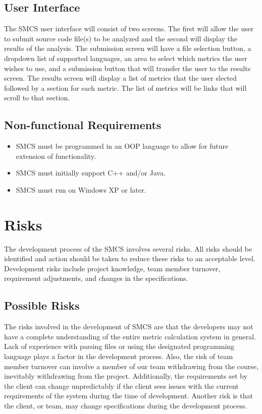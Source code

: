 \documentclass{scrreprt}
\begin{document}
	\section{User Interface}
	The SMCS user interface will consist of two screens. The first will allow the user to submit source code file(s) to be analyzed and the second will display the results of the analysis. The submission screen will have a file selection button, a dropdown list of supported languages, an area to select which metrics the user wishes to use, and a submission button that will transfer the user to the results screen. The results screen will display a list of metrics that the user slected followed by a section for each metric. The list of metrics will be links that will scroll to that section.
	
	\section{Non-functional Requirements}
	\begin{itemize}
		\item SMCS must be programmed in an OOP language to allow for future extension of functionality.
		\item  SMCS must initially support C++ and/or Java.
		\item SMCS must run on Windows XP or later.
	\end{itemize}
	\chapter{Risks}
	The development process of the SMCS involves several risks. All risks should be identified and action should be taken to reduce these risks to an acceptable level. Development risks include project knowledge, team member turnover, requirement adjustments, and changes in the specifications.
	\section{Possible Risks}
	The risks involved in the development of SMCS are that the developers may not have a complete understanding of the entire metric calculation system in general. Lack of experience with parsing files or using the designated programming language plays a factor in the development process. Also, the risk of team member turnover can involve a member of our team withdrawing from the course, inevitably withdrawing from the project. Additionally, the requirements set by the client can change unpredictably if the client sees issues with the current requirements of the system during the time of development. Another risk is that the client, or team, may change specifications during the development process.
\end{document}
